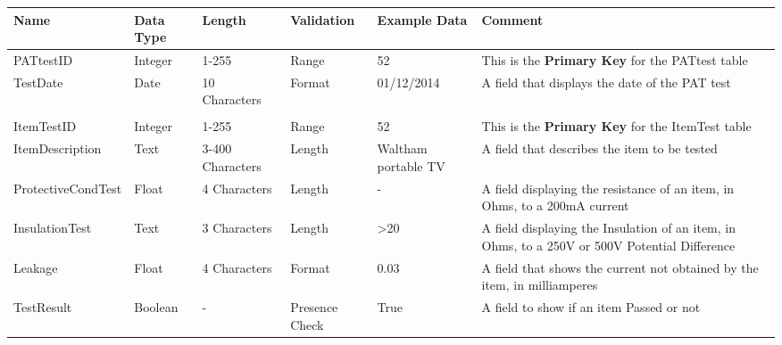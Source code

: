 \begin{landscape}
    \begin{center}
        \begin{tabular}{|p{3.4cm}|p{2cm}|p{2cm}|p{2cm}|p{4cm}|p{5cm}|}
            \hline
            \textbf{Name} & \textbf{Data Type} & \textbf{Length} & \textbf{Validation} & \textbf{Example Data} & \textbf{Comment} \\ \hline
            PATtestID          & Integer  & 1-255            & Range          & 52                  & This is the \textbf{Primary Key} for the PATtest table \\ \hline
            TestDate           & Date     & 10 Characters    & Format         & 01/12/2014          & A field that displays the date of the PAT test \\ \hline
             \\ \hline
            ItemTestID         & Integer  & 1-255            & Range          & 52                  & This is the \textbf{Primary Key} for the ItemTest table \\ \hline
            ItemDescription    & Text     & 3-400 Characters & Length         & Waltham portable TV & A field that describes the item to be tested \\ \hline
            ProtectiveCondTest & Float    & 4 Characters     & Length         & -                   & A field displaying the resistance of an item, in Ohms, to a 200mA 
                                                                                                      current  \\ \hline
            InsulationTest     & Text     & 3 Characters     & Length         & >20                 & A field displaying the Insulation of an item, in Ohms, to a 250V 
                                                                                                      or 500V Potential Difference \\ \hline
            Leakage            & Float    & 4 Characters     & Format         & 0.03                & A field that shows the current not obtained by the item, in 
                                                                                                     milliamperes \\ \hline
            TestResult         & Boolean  & -                & Presence Check & True                & A field to show if an item Passed or not\\ \hline
        \end{tabular}
    \end{center}
\end{landscape}

